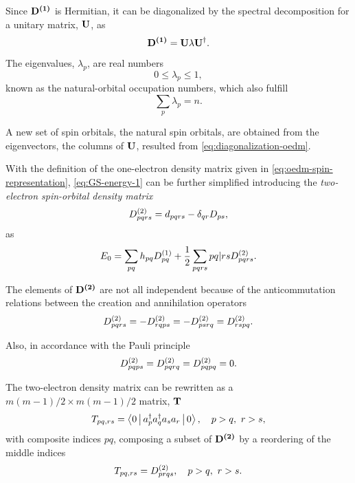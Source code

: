 Since $ \boldsymbol{\mathrm{D^{\left( 1 \right)}}}$ is Hermitian, it can be diagonalized by the spectral
decomposition for a unitary matrix, $ \boldsymbol{\mathrm{U}}$, as
\begin{equation} \label{eq:diagonalization-oedm}
    \boldsymbol{\mathrm{D^{\left( 1 \right)}}} =
    \boldsymbol{\mathrm{U}} \lambda \boldsymbol{\mathrm{U}}^{\dagger}
    .
\end{equation}

The eigenvalues, $\lambda_p$, are real numbers 
\begin{equation}
    0 \le \lambda_p \le 1
    ,
\end{equation}
known as the natural-orbital occupation numbers, which also fulfill 
\begin{equation}
    \sum_{p} \lambda_p = n
    .
\end{equation}

A new set of spin orbitals, the natural spin orbitals, are obtained from the
eigenvectors, the columns of $ \boldsymbol{\mathrm{U}}$, resulted from 
\cref{eq:diagonalization-oedm}.

With the definition of the one-electron density matrix given in 
\cref{eq:oedm-spin-representation}, \cref{eq:GS-energy-1} can be further
simplified introducing the \textit{two-electron spin-orbital density matrix}
\begin{equation} \label{eq:tedm-spin-representation}
    D^{\left( 2 \right)}_{pqrs} = d_{pqrs} - \delta_{qr} D_{ps}
    ,
\end{equation}
as
\begin{equation} \label{eq:GS-energy-2}
    E_0 =
    \sum_{pq} h_{pq} \oedm_{pq} + \frac{1}{2} \sum_{pqrs}
    \PBraket{pq | rs} \tedm_{pqrs}
    .
\end{equation}

The elements of $ \boldsymbol{\mathrm{D^{\left( 2 \right)}}}$ are not all independent because of the
anticommutation relations between the creation and annihilation operators 
\begin{equation}
    D^{\left( 2 \right)}_{pqrs} = - D^{\left( 2 \right)}_{rqps} = - D^{\left( 2 \right)}_{ps rq} = D^{\left( 2 \right)}_{rspq}
    .
\end{equation}

Also, in accordance with the Pauli principle 
\begin{equation}
    D^{\left( 2 \right)}_{pqps} = D^{\left( 2 \right)}_{pqrq} = D^{\left( 2 \right)}_{pqpq} = 0
    .
\end{equation}

The two-electron density matrix can be rewritten as a
$m\left( m-1 \right) /2 \times m\left( m-1 \right) /2$ 
matrix, $ \boldsymbol{\mathrm{T}}$ 
\begin{equation}
    T_{pq,rs} = \Braket{0 | a_p^{\dagger} a_q^{\dagger} a_s a_r | 0}
    , \quad
    p>q,\ r>s
    ,
\end{equation}
with composite indices $pq$, composing a subset of $ \boldsymbol{\mathrm{D^{\left( 2 \right)}}}$ by a
reordering of the middle indices 
\begin{equation}
    T_{pq,rs} = D^{\left( 2 \right)}_{prqs}
    , \quad
    p>q,\ r>s
    .
\end{equation}

